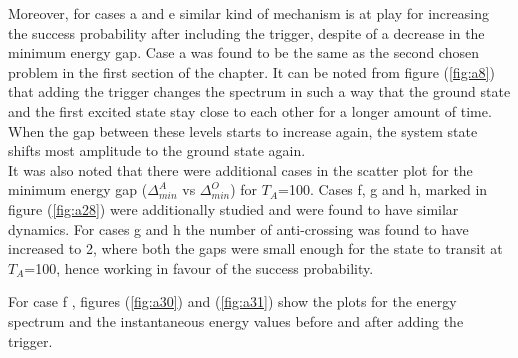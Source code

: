 \documentclass[12]{article}
\begin{document}
Moreover, for cases a and e similar kind of mechanism is at play for increasing the success probability after including the trigger, despite of a decrease in the minimum energy gap. Case a was found to be the same as the second chosen problem in the first section of the chapter. It can be noted from figure (\ref{fig:a8}) that adding the trigger changes the spectrum in such a way that the ground state and the first excited state stay close to each other for a longer amount of time. When the gap between these levels starts to increase again, the system state shifts most amplitude to the ground state again.\\

It was also noted that there were additional cases in the scatter plot for the minimum energy gap ($\Delta_{min}^A$ vs $\Delta_{min}^O$) for $T_A$=100. Cases f, g and h, marked in figure (\ref{fig:a28}) were additionally studied and were found to have similar dynamics. For cases g and h the number of anti-crossing was found to have increased to 2, where both the gaps were small enough for the state to transit at $T_A$=100, hence working in favour of the success probability. 

For case f , figures (\ref{fig:a30}) and (\ref{fig:a31}) show the plots for the energy spectrum and the instantaneous energy values before and after adding the trigger.
\end{document}
